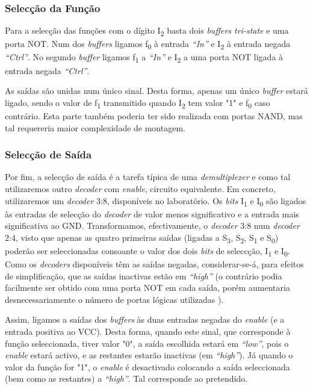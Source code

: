 \documentclass[a4paper,12pt]{article}
\begin{document}
\subsubsection{Selecção da Função}
Para a selecção das funções com o dígito I\textsubscript{2} basta dois 
{\it buffers tri-state} e uma porta NOT. Num dos {\it buffers} ligamos 
f\textsubscript{0} à entrada {\it ``In''} e I\textsubscript{2} à entrada 
negada {\it ``Ctrl''}. No segundo {\it buffer} ligamos f\textsubscript{1} a 
{\it ``In''} e I\textsubscript{2} a uma porta NOT ligada à entrada negada {\it 
``Ctrl''}. 
\par
As saídas são unidas num único sinal. Desta forma, apenas um único {\it 
buffer} estará ligado, sendo o valor de f\textsubscript{1} transmitido quando 
I\textsubscript{2} tem valor "1" e f\textsubscript{0} caso contrário. Esta 
parte também poderia ter sido realizada com portas NAND, mas tal requereria 
maior complexidade de montagem.
\par
\subsubsection{Selecção de Saída}
Por fim, a selecção de saída é a tarefa típica de uma {\it demultiplexer} 
e como tal utilizaremos outro {\it decoder} com {\it enable}, circuito 
equivalente. Em concreto, utilizaremos um {\it decoder} 3:8, disponíveis no 
laboratório. Os {\it bits} I\textsubscript{1} e I\textsubscript{0} são 
ligados às entradas de selecção do {\it decoder} de valor menos 
significativo e a entrada mais significativa ao GND. Transformamos, 
efectivamente, o {\it decoder} 3:8 num {\it decoder} 2:4, visto que apenas as 
quatro primeiras saídas (ligadas a S\textsubscript{3}, S\textsubscript{2}, 
S\textsubscript{1} e S\textsubscript{0}) poderão ser seleccionadas consoante o 
valor dos dois {\it bits} de seleccção, I\textsubscript{1} e 
I\textsubscript{0}. Como os {\it decoders} disponíveis têm as saídas 
negadas, considerar-se-á, para efeitos de simplificação, que as saídas 
inactivas estão em {\it ``high''} (o contrário podia facilmente ser obtido 
com uma porta NOT em cada saída, porém aumentaria desnecessariamente o 
número de portas lógicas utilizadas ). 
\par
Assim, ligamos a saídas dos {\it buffers} às duas entradas negadas do {\it 
enable} (e a entrada positiva ao VCC). Desta forma, quando este sinal, que 
corresponde à função seleccionada, tiver valor "0", a saída escolhida 
estará em {\it ``low''}, pois o {\it enable} estará activo, e as restantes 
estarão inactivas (em {\it ``high''}). Já quando o valor da função for "1", 
o {\it enable} é desactivado colocando a saída seleccionada (bem como as 
restantes) a {\it ``high''}. Tal corresponde ao pretendido.
\end{document}
